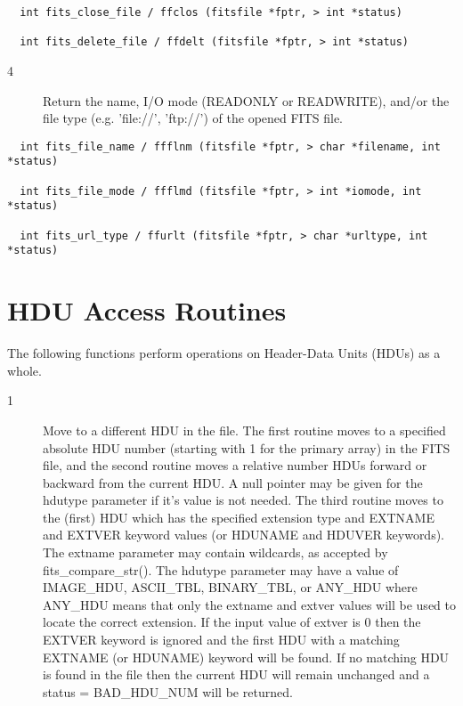 \documentclass[11pt]{book}
\begin{document}
\begin{verbatim}
  int fits_close_file / ffclos (fitsfile *fptr, > int *status)

  int fits_delete_file / ffdelt (fitsfile *fptr, > int *status)
\end{verbatim}

\begin{description}
\item[4 ]Return the name, I/O mode (READONLY or READWRITE), and/or the file
type (e.g. 'file://', 'ftp://') of the opened FITS file. \label{ffflnm}
 \label{ffflmd} \label{ffurlt}
\end{description}

\begin{verbatim}
  int fits_file_name / ffflnm (fitsfile *fptr, > char *filename, int *status)

  int fits_file_mode / ffflmd (fitsfile *fptr, > int *iomode, int *status)

  int fits_url_type / ffurlt (fitsfile *fptr, > char *urltype, int *status)
\end{verbatim}

\section{HDU Access Routines}

The following functions perform operations on Header-Data Units (HDUs)
as a whole.


\begin{description}
\item[1 ] Move to a different HDU in the file.  The first routine moves to a
    specified absolute HDU number (starting with 1 for the primary
    array) in the FITS file, and the second routine moves a relative
    number HDUs forward or backward from the current HDU.  A null
    pointer may be given for the hdutype parameter if it's value is
    not needed.  The third routine moves to the (first) HDU which has
    the specified extension type and EXTNAME and EXTVER keyword values
    (or HDUNAME and HDUVER keywords).  The extname parameter may
    contain wildcards, as accepted by fits\_compare\_str().  The
    hdutype parameter may have a value of IMAGE\_HDU, ASCII\_TBL,
    BINARY\_TBL, or ANY\_HDU where ANY\_HDU means that only the
    extname and extver values will be used to locate the correct
    extension.  If the input value of extver is 0 then the EXTVER
    keyword is ignored and the first HDU with a matching EXTNAME (or
    HDUNAME) keyword will be found.  If no matching HDU is found in
    the file then the current HDU will remain unchanged and a status =
    BAD\_HDU\_NUM will be returned.
  \label{ffmahd} \label{ffmrhd} \label{ffmnhd}
\end{description}
\end{document}
